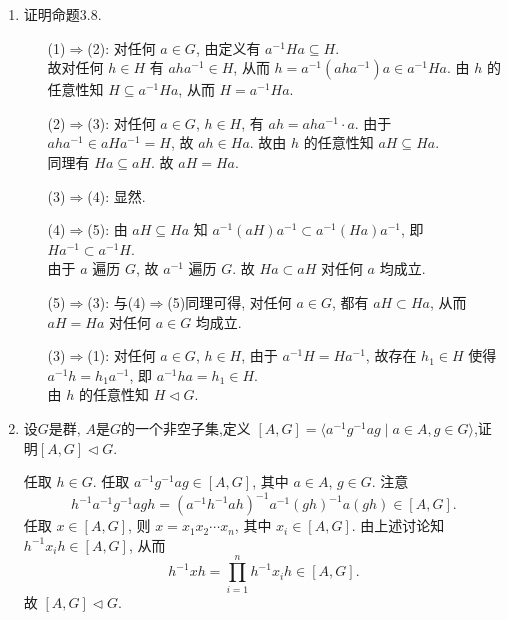 \begin{enumerate}
\item 证明命题3.8.
\begin{solution}
    \begin{enumerate}
        \item[(1)$\Rightarrow$(2): ]
        对任何 $a \in G$, 由定义有 $a^{-1}Ha \subseteq H$. \\
        故对任何 $h \in H$ 有 $a h a^{-1} \in H$,
        从而 $h=a^{-1}(aha^{-1})a \in a^{-1}Ha$.
        由 $h$ 的任意性知 $H \subseteq a^{-1}Ha$,
        从而 $H=a^{-1}Ha$. 
        \item[(2)$\Rightarrow$(3): ]
        对任何 $a \in G$, $h \in H$, 有 $ah=aha^{-1}\cdot a$.
        由于 $aha^{-1} \in aHa^{-1}=H$, 故 $ah \in Ha$.
        故由 $h$ 的任意性知 $aH\subseteq Ha$. \\
        同理有 $Ha\subseteq aH$. 故 $aH=Ha$. 
        \item[(3)$\Rightarrow$(4): ]
        显然. 
        \item[(4)$\Rightarrow$(5): ]
        由 $aH\subseteq Ha$ 知
        $a^{-1}(aH)a^{-1} \subset a^{-1}(Ha)a^{-1}$,
        即 $Ha^{-1} \subset a^{-1}H$. \\
        由于 $a$ 遍历 $G$, 故 $a^{-1}$ 遍历 $G$. 
        故 $Ha \subset aH$ 对任何 $a$ 均成立. 
        \item[(5)$\Rightarrow$(3): ]
        与(4)$\Rightarrow$(5)同理可得,
        对任何 $a\in G$, 都有 $aH \subset Ha$,
        从而 $aH=Ha$ 对任何 $a\in G$ 均成立. \\
        \item[(3)$\Rightarrow$(1): ]
        对任何 $a\in G$, $h\in H$,
        由于 $a^{-1}H = Ha^{-1}$,
        故存在 $h_1\in H$ 使得 $a^{-1}h=h_1a^{-1}$,
        即 $a^{-1}ha=h_1 \in H$. \\
        由 $h$ 的任意性知 $H \triangleleft G$. \qedhere
    \end{enumerate}
\end{solution}

\item 设$G$是群, $A$是$G$的一个非空子集,定义 $\left[A,G\right] = \langle a^{-1}g^{-1}ag \mid a \in A, g \in G \rangle$,证明$\left[A,G\right] \triangleleft G$.
\begin{solution}
    任取 $h\in G$.
    任取 $a^{-1}g^{-1}ag \in [A,G]$, 其中 $a\in A$, $g\in G$.
    注意 
    $$h^{-1}a^{-1}g^{-1}agh = \left( a^{-1}h^{-1}ah \right)^{-1} a^{-1}\left(gh\right)^{-1}a(gh) \in [A,G].$$
    任取 $x\in [A,G]$,
    则 $x=x_1x_2\cdots x_n$,
    其中 $x_i \in [A,G]$.
    由上述讨论知 $h^{-1}x_ih \in [A,G]$, 从而
    $$h^{-1}xh=\prod_{i=1}^n h^{-1}x_i h \in [A,G].$$
    故 $[A,G] \triangleleft G$. 
\end{solution}


\end{enumerate}
